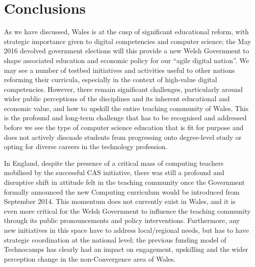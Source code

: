 \documentclass{llncs}
\begin{document}
\section{Conclusions}\label{conclusions}


As we have discussed, Wales is at the cusp of significant educational
reform, with strategic importance given to digital competencies and
computer science; the May 2016 devolved government elections will this
provide a new Welsh Government to shape associated education and
economic policy for our ``agile digital nation''.  We may see a number
of testbed initiatives and activities useful to other nations
reforming their curricula, especially in the context of high-value
digital competencies.
However, there remain significant challenges, particularly around
wider public perceptions of the disciplines and its inherent
educational and economic value, and how to upskill the entire teaching
community of Wales. This is the profound and long-term challenge that
has to be recognised and addressed before we see the type of computer
science education that is fit for purpose and does not actively
dissuade students from progressing onto degree-level study or opting
for diverse careers in the technology profession.

In England, despite the presence of a critical mass of computing
teachers mobilised by the successful CAS initiative, there was still a
profound and disruptive shift in attitude felt in the teaching
community once the Government formally announced the new Computing
curriculum would be introduced from September 2014.  This momentum
does not currently exist in Wales, and it is even more critical for
the Welsh Government to influence the teaching community through its
public pronouncements and policy interventions. Furthermore, any new
initiatives in this space have to address local/regional needs, but
has to have strategic coordination at the national level; the previous
funding model of Technocamps has clearly had an impact on engagement,
upskilling and the wider perception change in the non-Convergence area
of Wales.
\end{document}

